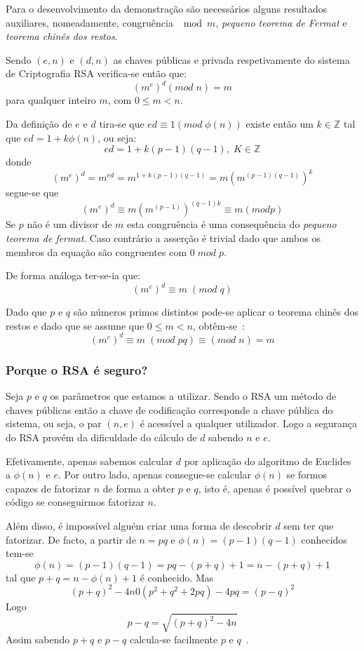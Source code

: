 Para o desenvolvimento da demonstração são necessários alguns resultados auxiliares, nomeadamente, congruência $\mod m$, \emph{pequeno teorema de Fermat} e \emph{teorema chinês dos restos}.

\begin{teorema}
Sendo $(e,n)$ e $(d,n)$ as chaves públicas e privada respetivamente do sistema de Criptografia RSA verifica-se então que:
$$(m^e)^d(mod \; n)=m$$
para qualquer inteiro $m$, com $0 \le m < n$.
\end{teorema}

\begin{demonstracao}
Da definição de $e$ e $d$ tira-se que $ed \equiv 1 (mod \; \phi(n))$ existe então um $k \in \mathbb{Z}$ tal que $ed= 1+ k\phi(n)$, ou seja:
$$ed=1+k(p-1)(q-1), \; K \in \mathbb{Z}$$
donde
$$(m^e)^d=m^{ed}=m^{1+k(p-1)(q-1)}=m(m^{(p-1)(q-1)})^k$$
segue-se que
$$(m^e)^d \equiv m(m^{(p-1)})^{(q-1)k} \equiv m(mod p)$$
Se $p$ não é um divisor de $m$ esta congruência é uma consequência do \emph{pequeno teorema  de fermat}. Caso contrário a asserção é trivial dado que ambos os membros da equação são congruentes com $0 \; mod \; p$.

De forma análoga ter-se-ia que:
$$(m^e)^d \equiv m\;(mod \; q)$$

Dado que $p$ e $q$ são números primos distintos pode-se aplicar o teorema chinês dos restos e dado que se assume que $0 \le m < n$, obtêm-se~\cite{Quaresma2009a}:
$$(m^e)^d \equiv m\;(mod \; pq) \equiv(mod \; n)=m$$
\end{demonstracao}

\subsubsection{Porque o RSA é seguro?}
\label{sec:porqueeRSAeseguro}

Seja $p$ e $q$ os parâmetros que estamos a utilizar. Sendo o RSA um método de chaves públicas então a chave de codificação corresponde a chave pública do sistema, ou seja, o par $(n,e)$ é acessível a qualquer utilizador. Logo a segurança do RSA provém da dificuldade do cálculo de $d$ sabendo $n$ e $e$.

Efetivamente, apenas sabemos calcular $d$ por aplicação do algoritmo de Euclides a $\phi(n)$ e $e$. Por outro lado, apenas consegue-se calcular $\phi(n)$ se formos capazes de fatorizar $n$ de forma a obter $p$ e $q$, isto é, apenas é possível quebrar o código se conseguirmos fatorizar $n$.

Além disso, é impossível alguém criar uma forma de descobrir $d$ sem ter que fatorizar.
De facto, a partir de $n=pq$ e $\phi(n)=(p-1)(q-1)$ conhecidos tem-se
$$\phi(n)=(p-1)(q-1)=pq-(p+q)+1=n-(p+q)+1$$
tal que $p+q=n-\phi(n)+1$ é conhecido. Mas
$$(p+q)^2-4n0(p^2+q^2+2pq)-4pq=(p-q)^2$$
Logo
$$p-q=\sqrt{(p+q)^2-4n}$$
Assim sabendo $p+q$ e $p-q$ calcula-se facilmente $p$ e $q$~\cite{Coutinho2005}.

